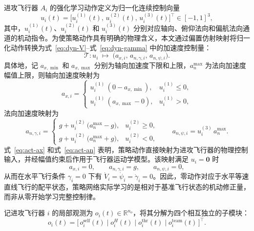 进攻飞行器 $A_i$ 的强化学习动作定义为归一化连续控制向量
\begin{equation}
u_i(t)=\bigl[u_i^{(1)}(t),\,u_i^{(2)}(t),\,u_i^{(3)}(t)\bigr]^{\top}\in[-1,1]^3,
\label{eq:rl-action}
\end{equation}
其中，$u_i^{(1)}(t)$、$u_i^{(2)}(t)$ 和 $u_i^{(3)}(t)$ 分别对应轴向、俯仰法向和偏航法向通道的机动指令。为使策略动作具有明确的物理含义，本文通过偏置仿射映射将归一化动作转换为式~\eqref{eq:dyn-V}--式~\eqref{eq:dyn-gamma} 中的加速度控制量：
\begin{equation}
\mathcal{T}:u_i\;\longmapsto\;\bigl(a_{x,i},\,a_{n,\gamma,i},\,a_{n,\psi,i}\bigr).
\end{equation}
具体地，记 $a_{x,\min}$ 和 $a_{x,\max}$ 分别为轴向加速度下限和上限，$a_{n}^{\max}$ 为法向加速度幅值上限，则轴向加速度映射为
\begin{equation}
a_{x,i}=
\begin{cases}
u_i^{(1)}\,(0-a_{x,\min}), & u_i^{(1)}\le 0,\\[2pt]
u_i^{(1)}\,(a_{x,\max}-0), & u_i^{(1)}>0,
\end{cases}
\label{eq:act-ax}
\end{equation}
法向加速度映射为
\begin{equation}
a_{n,\gamma,i}=
\begin{cases}
g+u_i^{(2)}\,\bigl(a_{n}^{\max}-g\bigr), & u_i^{(2)}\ge 0,\\[2pt]
g+u_i^{(2)}\,\bigl(a_{n}^{\max}+g\bigr), & u_i^{(2)}<0,
\end{cases}
\qquad
a_{n,\psi,i}=u_i^{(3)}\,a_{n}^{\max}.
\label{eq:act-an}
\end{equation}
式~\eqref{eq:act-ax} 和式~\eqref{eq:act-an} 表明，策略动作直接映射为进攻飞行器的物理控制输入，并经幅值约束后作用于飞行器运动学模型。该映射满足 $u_i=\mathbf{0}$ 时
\begin{equation}
a_{x,i}=0,\qquad a_{n,\gamma,i}=g,\qquad a_{n,\psi,i}=0,
\end{equation}
从而在水平飞行条件 $\gamma_i=0$ 下有 $\dot V_i=\dot\psi_i=\dot\gamma_i=0$。因此，零动作对应于水平等速直线飞行的配平状态，策略网络实际学习的是相对于基准飞行状态的机动修正量，而非从零开始学习完整控制律。





记进攻飞行器 $i$ 的局部观测为 $o_i(t)\in\mathbb{R}^{n_o}$，将其分解为四个相互独立的子模块：
\begin{equation}
o_i(t)=\bigl[\,o_i^{\mathrm{self}}(t)\;\big|\;o_i^{H}(t)\;\big|\;o_i^{\mathrm{thr}}(t)\;\big|\;o_i^{\mathrm{team}}(t)\,\bigr]^{\top}.
\label{eq:obs-decomp}
\end{equation}


